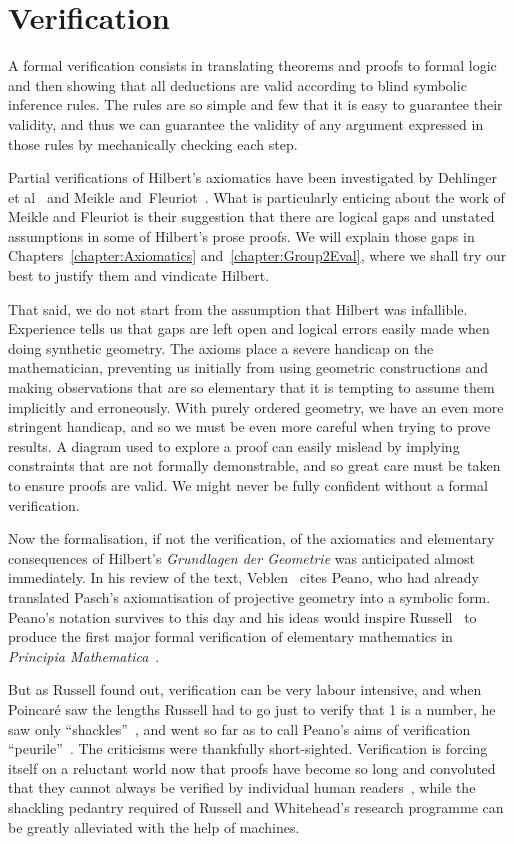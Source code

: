 \section{Verification}
A formal verification consists in translating theorems and proofs to formal logic and then showing that all deductions are valid according to blind symbolic inference rules. The rules are so simple and few that it is easy to guarantee their validity, and thus we can guarantee the validity of any argument expressed in those rules by mechanically checking each step.

Partial verifications of Hilbert's axiomatics have been investigated by Dehlinger et al~\cite{DehlingerFOG} and Meikle and~Fleuriot~\cite{MeikleFleuriotFormalizingHilbert}. What is particularly enticing about the work of Meikle and Fleuriot is their suggestion that there are logical gaps and unstated assumptions in some of Hilbert's prose proofs. We will explain those gaps in Chapters~\ref{chapter:Axiomatics} and~\ref{chapter:Group2Eval}, where we shall try our best to justify them and vindicate Hilbert.

That said, we do not start from the assumption that Hilbert was infallible. Experience tells us that gaps are left open and logical errors easily made when doing synthetic geometry. The axioms place a severe handicap on the mathematician, preventing us initially from using geometric constructions and making observations that are so elementary that it is tempting to assume them implicitly and erroneously. With purely ordered geometry, we have an even more stringent handicap, and so we must be even more careful when trying to prove results. A diagram used to explore a proof can easily mislead by implying constraints that are not formally demonstrable, and so great care must be taken to ensure proofs are valid. We might never be fully confident without a formal verification.

Now the formalisation, if not the verification, of the axiomatics and elementary consequences of Hilbert's \emph{Grundlagen der Geometrie} was anticipated almost immediately. In his review of the text, Veblen~\cite{VeblenHilbertReview} cites Peano, who had already translated Pasch's axiomatisation of projective geometry into a symbolic form. Peano's notation survives to this day and his ideas would inspire Russell~\cite{PrinciplesOfMathematics} to produce the first major formal verification of elementary mathematics in \emph{Principia Mathematica}~\cite{Principia}.

But as Russell found out, verification can be very labour intensive, and when Poincar\'{e} saw the lengths Russell had to go just to verify that 1 is a number, he saw only ``shackles''~\cite{PoincareShackles}, and went so far as to call Peano's aims of verification ``peurile''~\cite{PoincareReview}. The criticisms were thankfully short-sighted. Verification is forcing itself on a reluctant world now that proofs have become so long and convoluted that they cannot always be verified by individual human readers~\cite{WhitherMathematics}, while the shackling pedantry required of Russell and Whitehead's research programme can be greatly alleviated with the help of machines.


